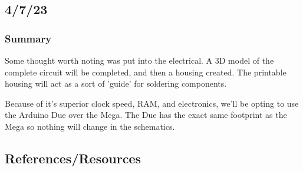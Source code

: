 \documentclass[a4paper, 10pt]{article}
\begin{document}
	\subsection{4/7/23}
		\subsubsection{Summary}
		Some thought worth noting was put into the electrical. A 3D model of the complete circuit will be completed, and then a housing created. The printable housing will act as a sort of 'guide' for soldering components. 
		
		Because of it's superior clock speed, RAM, and electronics, we'll be opting to use the Arduino Due over the Mega. The Due has the exact same footprint as the Mega so nothing will change in the schematics.
	\subsection{References/Resources}
\end{document}
